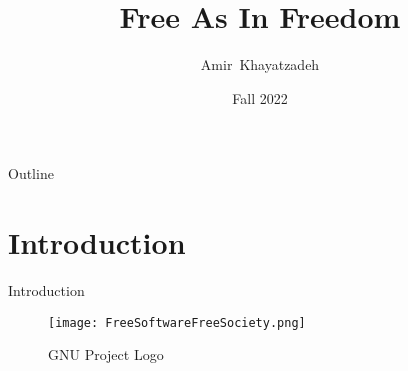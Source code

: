 \documentclass{beamer}
\title{Free As In Freedom}
\author{Amir~Khayatzadeh}
\institute[IAUM]{Islamic Azad University\\ Mashhad Branch}
\date{Fall 2022}
\begin{document}
    \begin{frame}
        \titlepage
    \end{frame}

        \begin{frame}{Outline}
            \tableofcontents
        \end{frame}
    \section{Introduction}
    \begin{frame}{Introduction}
        \begin{figure}
            \centering
                \texttt{[image: FreeSoftwareFreeSociety.png]}
                \caption{GNU Project Logo \cite{GNUDOTORG:2}}
        \end{figure}
    \end{frame}
\end{document}
